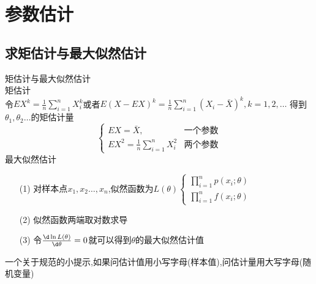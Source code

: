 \documentclass[12pt, a4paper, oneside, UTF8]{ctexbook}
\begin{document}
% 
\else
\fi

\chapter{参数估计}

\section{求矩估计与最大似然估计}
\begin{remark}
    矩估计与最大似然估计 \\
    矩估计\\
    令$EX^k=\frac{1}{n}\sum_{i=1}^{n}X_i^k$或者$E(X-EX)^k=\frac{1}{n}\sum_{i=1}^{n}(X_i-\bar{X})^k,k=1,2,\ldots$
    得到$\theta_1,\theta_2\ldots$的矩估计量 \\
    \[
    \begin{cases}
        EX=\bar{X}, &\text{一个参数} \\
        EX^2=\frac{1}{n}\sum_{i=1}^{n}X_i^2 & \text{两个参数}
    \end{cases}
    \]
    最大似然估计
    \begin{enumerate}
        \item[(1)]对样本点$x_1,x_2\ldots,x_n$,似然函数为$L(\theta)\begin{cases}
        \prod_{i=1}^{n}p(x_i;\theta) \\
        \prod_{i=1}^{n}f(x_i;\theta) 
    \end{cases}$
    \item[(2)]似然函数两端取对数求导 
    \item[(3)]令$\frac{\d\ln{L(\theta)}}{\d\theta}=0$就可以得到$\theta$的最大似然估计值
    \end{enumerate}
    一个关于规范的小提示,如果问估计值用小写字母(样本值),问估计量用大写字母(随机变量)
\end{remark}
\end{document}

